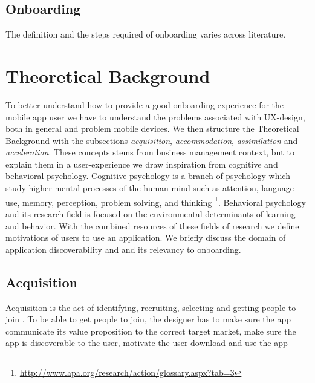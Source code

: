 \subsection{Onboarding}
The definition and the steps required of onboarding varies across literature.

\section{Theoretical Background}
To better understand how to provide a good onboarding experience for the mobile app user we have to understand the problems associated with UX-design, both in general and problem mobile devices. We then structure the Theoretical Background with the subsections \textit{acquisition}, \textit{accommodation}, \textit{assimilation} and \textit{acceleration}. These concepts stems from business management context, but to explain them in a user-experience we draw inspiration from cognitive and behavioral psychology. Cognitive psychology is a branch of psychology which study higher mental processes of the human mind such as attention, language use, memory, perception, problem solving, and thinking \footnote{\url{http://www.apa.org/research/action/glossary.aspx?tab=3}}. Behavioral psychology and its research field is focused on the environmental determinants of learning and behavior. With the combined resources of these fields of research we define motivations of users to use an application. We briefly discuss the domain of application discoverability and and its relevancy to onboarding.

\subsection{Acquisition}
Acquisition is the act of identifying, recruiting, selecting and getting people to join \cite{Bradt2009}. To be able to get people to join, the designer has to make sure the app communicate its value proposition to the correct target market, make sure the app is discoverable to the user, motivate the user download and use the app

